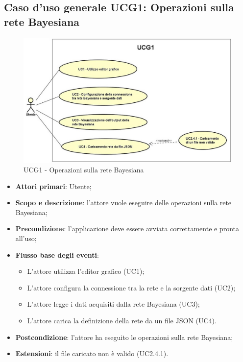 \newpage
\subsection{Caso d'uso generale UCG1: Operazioni sulla rete Bayesiana}
\begin{figure} [H]
	\centering
	\includegraphics[scale=0.7]{Img/UCG1}
	\caption{UCG1 - Operazioni sulla rete Bayesiana}\label{}
\end{figure}
\begin{itemize}
	\item{\textbf{Attori primari}: Utente;}
	\item{\textbf{Scopo e descrizione}: l'attore vuole eseguire delle operazioni sulla rete Bayesiana;}
	\item{\textbf{Precondizione}: l'applicazione deve essere avviata correttamente e pronta all'uso;}
	\item{\textbf{Flusso base degli eventi}:
		\begin{itemize}
			\item{L'attore utilizza l'editor grafico (UC1);}
			\item{L'attore configura la connessione tra la rete e la sorgente dati (UC2);}
			\item{L'attore legge i dati acquisiti dalla rete Bayesiana (UC3)};
			\item{L'attore carica la definizione della rete da un file JSON (UC4).}
		\end{itemize}
	}
	\item{\textbf{Postcondizione}: l'attore ha eseguito le operazioni sulla rete Bayesiana;}
	\item{\textbf{Estensioni}: il file caricato non è valido (UC2.4.1).}
\end{itemize}

